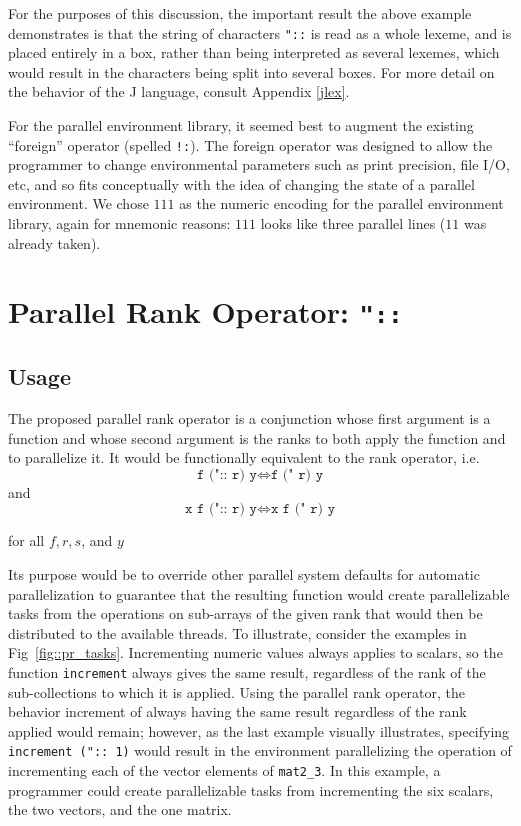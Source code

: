 For the purposes of this discussion, the important result the above example demonstrates 
is that the string of characters \texttt{"::} is read as a whole lexeme, and is placed entirely in a box, 
rather than being interpreted as several lexemes, 
which would result in the characters being split into several boxes.
For more detail on the behavior of the J language, consult Appendix \ref{jlex}. %

For the parallel environment library, 
it seemed best to augment the existing ``\gls{foreign}'' operator (spelled \texttt{!:}).  
The foreign operator was designed to 
allow the programmer to change environmental parameters 
such as print precision, file I/O, etc\cite{jvocab}, 
and so fits conceptually with the idea of changing the state of a parallel environment. 
We chose $111$ as the numeric encoding for the parallel environment library, again for mnemonic reasons: 
$111$ looks like three parallel lines ($11$ was already taken).

\section{Parallel Rank Operator: \texttt{"::}}
\label{prank}

\subsection{Usage}
The proposed parallel rank operator is a conjunction 
whose first argument is a function 
and whose second argument is the ranks to both apply the function and to parallelize it. 
It would be functionally equivalent to the rank operator, i.e. 
\[\texttt{f (":: r) y} \Leftrightarrow \texttt{f (" r) y}\] and
\[\texttt{x f (":: r) y} \Leftrightarrow \texttt{x f (" r) y}\]

for all $f, r, s$, and $y$

Its purpose would be to override other parallel system defaults for automatic parallelization
to guarantee that the resulting function would create parallelizable tasks from 
the operations on sub-arrays of the given rank that would then be distributed to the available threads.
To illustrate, consider the examples in Fig~\ref{fig::pr_tasks}.
Incrementing numeric values always applies to scalars, so the function \texttt{increment} always gives the same result, 
regardless of the rank of the sub-collections to which it is applied. 
Using the parallel rank operator, the behavior increment of 
always having the same result regardless of the rank applied would remain; 
however, as the last example visually illustrates, 
specifying \texttt{increment (":: 1)} would result in the environment parallelizing 
the operation of incrementing each of the vector elements of \texttt{mat2\_3}.
In this example, a programmer could create parallelizable tasks from incrementing 
the six scalars, the two vectors, and the one matrix.

